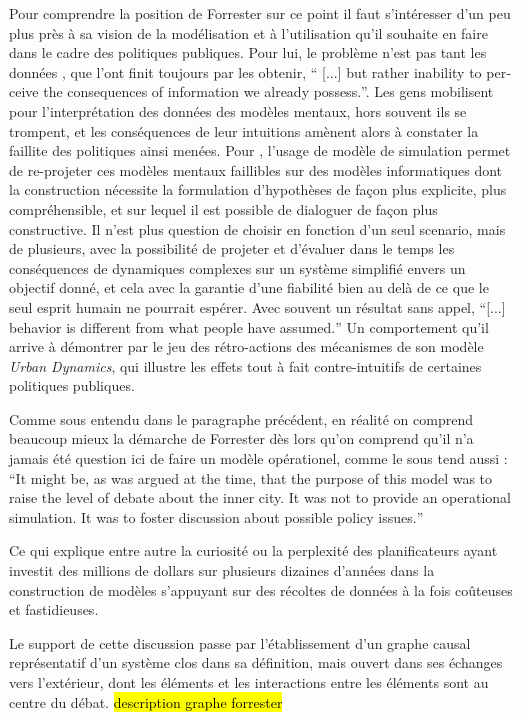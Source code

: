 Pour comprendre la position de Forrester sur ce point il faut s'intéresser d'un peu plus près à sa vision de la modélisation et à l'utilisation qu'il souhaite en faire dans le cadre des politiques publiques. Pour lui, le problème n'est pas tant les données , que l'ont finit toujours par les obtenir, \foreignquote{english}{ [...] but rather inability to perceive the consequences of information we already possess.}. Les gens mobilisent pour l'interprétation des données des modèles mentaux, hors souvent ils se trompent, et les conséquences de leur intuitions amènent alors à constater la faillite des politiques ainsi menées. Pour \textcite{Forrester1971}, l'usage de modèle de simulation permet de re-projeter ces modèles mentaux faillibles sur des modèles informatiques dont la construction nécessite la formulation d'hypothèses de façon plus explicite, plus compréhensible, et sur lequel il est possible de dialoguer de façon plus constructive. Il n'est plus question de choisir en fonction d'un seul scenario, mais de plusieurs, avec la possibilité de projeter et d'évaluer dans le temps les conséquences de dynamiques complexes sur un système simplifié envers un objectif donné, et cela avec la garantie d'une fiabilité bien au delà de ce que le seul esprit humain ne pourrait espérer. Avec souvent un résultat sans appel, \foreignquote{english}{[...] behavior is different from what people have assumed.} Un comportement qu'il arrive à démontrer par le jeu des rétro-actions des mécanismes de son modèle \textit{Urban Dynamics}, qui illustre les effets tout à fait contre-intuitifs de certaines politiques publiques.

Comme sous entendu dans le paragraphe précédent, en réalité on comprend beaucoup mieux la démarche de Forrester dès lors qu'on comprend qu'il n'a jamais été question ici de faire un modèle opérationel, comme le sous tend aussi \autocite{Batty2001} : \foreignquote{english}{It might be, as was argued at the time, that the purpose of this model was to raise the level of debate about the inner city. It was not to provide an operational simulation. It was to foster discussion about possible policy issues.}

Ce qui explique entre autre la curiosité ou la perplexité des planificateurs \autocite{Lee1973} ayant investit des millions de dollars sur plusieurs dizaines d'années dans la construction de modèles s'appuyant sur des récoltes de données à la fois coûteuses et fastidieuses.

Le support de cette discussion passe par l'établissement d'un graphe causal représentatif d'un système clos dans sa définition, mais ouvert dans ses échanges vers l'extérieur, dont les éléments et les interactions entre les éléments sont au centre du débat. \hl{description graphe forrester}

